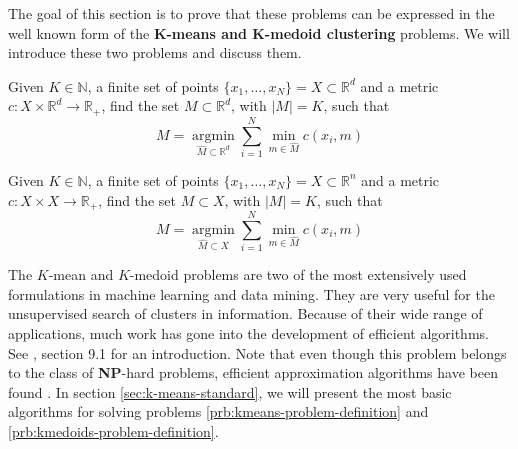 The goal of this section is to prove that these problems can be expressed in the well known form of the \textbf{$\mathbf{K}$-means and $\mathbf{K}$-medoid clustering} problems.
We will introduce these two problems and discuss them.
\begin{problem}
  \label{prb:kmeans-problem-definition}
  Given $K\in \mathbb{N}$, a finite set of points $\{x_1,\ldots , x_N\} = X\subset\mathbb{R}^d$ and a metric $c:X\times \mathbb{R}^d\rightarrow\mathbb{R}_+$, find the set $M\subset\mathbb{R}^d$, with $|M|=K$, such that
  \begin{equation}
    \label{eq:kmeans-problem-definition}
    M = \underset{\hat{M}\subset\mathbb{R}^{d}}{\operatorname{argmin}} \sum_{i=1}^N\min\limits_{m\in \hat{M}}c(x_i, m)
  \end{equation}
\end{problem}
\begin{problem}
  \label{prb:kmedoids-problem-definition}
  Given $K\in \mathbb{N}$, a finite set of points $\{x_1,\ldots , x_N\} = X\subset\mathbb{R}^n$ and a metric $c:X\times X\rightarrow\mathbb{R}_+$, find the set $M\subset X$, with $|M|=K$, such that
  \begin{equation}
    \label{eq:kmedoids-problem-definition}
    M = \underset{\hat{M}\subset X}{\operatorname{argmin}} \sum_{i=1}^N\min\limits_{m\in \hat{M}}c(x_i, m)
  \end{equation}
\end{problem}
The $K$-mean and $K$-medoid problems are two of the most extensively used formulations in machine learning and data mining.
They are very useful for the unsupervised search of clusters in information.
Because of their wide range of applications, much work has gone into the development of efficient algorithms.
See , section 9.1 for an introduction.
Note that even though this problem belongs to the class of \textbf{NP}-hard problems, efficient approximation algorithms have been found \cite{Vazirani2003}.
In section \ref{sec:k-means-standard}, we will present the most basic algorithms for solving problems \ref{prb:kmeans-problem-definition} and \ref{prb:kmedoids-problem-definition}.

